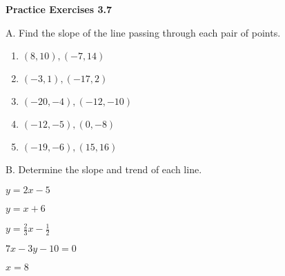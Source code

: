   \vspace{0.8ex}
\noindent\textbf{Practice Exercises 3.7}

\vspace{0.2ex}

\noindent A. Find the slope of the line passing through each pair of points.
\vspace{-1ex}
\begin{multicols}{3}
\begin{enumerate}[label = \arabic*. ]
   \item $ (8,10), (-7,14) $
   \item $ (-3,1), (-17,2) $
   \item $ (-20,-4), (-12,-10) $
   \item $ (-12,-5), (0,-8) $
   \item $ (-19,-6), (15,16) $
\end{enumerate}
\end{multicols}
				
\noindent B. Determine  the slope and trend  of each  line. 
\begin{enumerate}[label = \arabic*. ]
\begin{multicols}{3}

\item $ y =2x-5 $ 

\item $ y =x+6 $ 

\item $ y =\displaystyle  \frac{2}{3}x-\displaystyle  \frac{1}{2} $ 

\item $ 7x-3y-10 = 0 $ 

\item $ x  = 8 $ 

\end{multicols} 
\end{enumerate}  				


